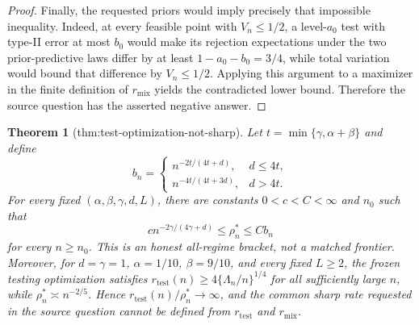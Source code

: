 \documentclass{article}
\newtheorem{theorem}{Theorem}
\begin{document}
\begin{proof}
Finally, the requested priors would imply precisely that impossible inequality. Indeed, at every feasible point with \(V_n\le1/2\), a level-\(a_0\) test with type-II error at most \(b_0\) would make its rejection expectations under the two prior-predictive laws differ by at least \(1-a_0-b_0=3/4\), while total variation would bound that difference by \(V_n\le1/2\). Applying this argument to a maximizer in the finite definition of \(r_{\mathrm{mix}}\) yields the contradicted lower bound. Therefore the source question has the asserted negative answer.
\end{proof}

\begin{theorem}[thm:test-optimization-not-sharp]\label{thm:test-optimization-not-sharp}
Let \(t=\min\{\gamma,\alpha+\beta\}\) and define
\[
 b_n=\begin{cases}
 n^{-2t/(4t+d)},&d\le4t,\\
 n^{-4t/(4t+3d)},&d>4t.
 \end{cases}
\]
For every fixed \((\alpha,\beta,\gamma,d,L)\), there are constants \(0<c<C<\infty\) and \(n_0\) such that
\[
 c n^{-2\gamma/(4\gamma+d)}\le\rho_n^*\le Cb_n
\]
for every \(n\ge n_0\). This is an honest all-regime bracket, not a matched frontier. Moreover, for \(d=\gamma=1\), \(\alpha=1/10\), \(\beta=9/10\), and every fixed \(L\ge2\), the frozen testing optimization satisfies \(r_{\mathrm{test}}(n)\ge4\{\Lambda_n/n\}^{1/4}\) for all sufficiently large \(n\), while \(\rho_n^*\asymp n^{-2/5}\). Hence \(r_{\mathrm{test}}(n)/\rho_n^*\to\infty\), and the common sharp rate requested in the source question cannot be defined from \(r_{\mathrm{test}}\) and \(r_{\mathrm{mix}}\).
\end{theorem}
\end{document}
